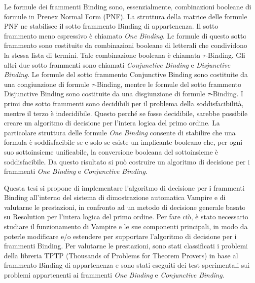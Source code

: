 \documentclass[./main.tex]{subfiles}
\begin{document}
Le formule dei frammenti Binding sono, essenzialmente, combinazioni booleane di formule in Prenex Normal Form (PNF).
La struttura della matrice delle formule PNF ne stabilisce il sotto frammento Binding di appartenenza.
Il sotto frammento meno espressivo è chiamato \textit{One Binding}.
Le formule di questo sotto frammento sono costituite da combinazioni booleane di 
letterali che condividono la stessa lista di termini. 
Tale combinazione booleana è chiamata $\tau$-Binding.
Gli altri due sotto frammenti sono chiamati \textit{Conjunctive Binding} e \textit{Disjunctive Binding}.
Le formule del sotto frammento Conjunctive Binding sono costituite da una congiunzione di formule $\tau$-Binding,
mentre le formule del sotto frammento Disjunctive Binding sono costituite da una disgiunzione di formule $\tau$-Binding.
I primi due sotto frammenti sono decidibili per il problema della soddisfacibilità, mentre il terzo è indecidibile.
Questo perché se fosse decidibile, sarebbe possibile creare un algoritmo di decisione per l'intera logica del primo ordine.
La particolare struttura delle formule \textit{One Binding} consente di stabilire che 
una formula è soddisfacibile se e solo se esiste un implicante booleano che, per ogni suo sottoinsieme unificabile,
la conversione booleana del sottoinsieme è soddisfacibile.
Da questo risultato si può costruire un algoritmo di decisione per i frammenti \textit{One Binding} e \textit{Conjunctive Binding}.

% 

Questa tesi si propone di implementare l'algoritmo di decisione per i frammenti Binding
all'interno del sistema di dimostrazione automatica Vampire 
e di valutarne le prestazioni, in confronto ad un metodo di decisione generale
basato su Resolution per l'intera logica del primo ordine.
Per fare ciò, è stato necessario studiare il funzionamento di Vampire e le sue componenti principali,
in modo da poterle modificare e/o estendere per supportare l'algoritmo di decisione per i frammenti Binding.
Per valutarne le prestazioni, sono stati classificati i problemi della libreria TPTP (Thousands of Problems for Theorem Provers)
in base al frammento Binding di appartenenza e sono stati eseguiti dei test sperimentali sui problemi
appartenenti ai frammenti \textit{One Binding} e \textit{Conjunctive Binding}.

% 
\end{document}
